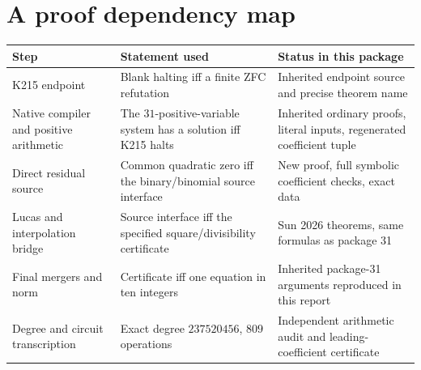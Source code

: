 \documentclass[11pt,a4paper]{article}
\theoremstyle{remark}
\begin{document}
\section{A proof dependency map}\label{app:dependencies}
\begin{center}\small
\begin{tabular}{@{}>{\raggedright\arraybackslash}p{42mm}>{\raggedright\arraybackslash}p{49mm}>{\raggedright\arraybackslash}p{58mm}@{}}
\toprule
Step & Statement used & Status in this package\\
\midrule
K215 endpoint &
Blank halting iff a finite ZFC refutation &
Inherited endpoint source and precise theorem name\\[2mm]
Native compiler and positive arithmetic &
The \(31\)-positive-variable system has a solution iff K215 halts &
Inherited ordinary proofs, literal inputs, regenerated coefficient tuple\\[2mm]
Direct residual source &
Common quadratic zero iff the binary/binomial source interface &
New proof, full symbolic coefficient checks, exact data\\[2mm]
Lucas and interpolation bridge &
Source interface iff the specified square/divisibility certificate &
Sun 2026 theorems, same formulas as package 31\\[2mm]
Final mergers and norm &
Certificate iff one equation in ten integers &
Inherited package-31 arguments reproduced in this report\\[2mm]
Degree and circuit transcription &
Exact degree \(237520456\), \(809\) operations &
Independent arithmetic audit and leading-coefficient certificate\\
\bottomrule
\end{tabular}
\end{center}
\end{document}
